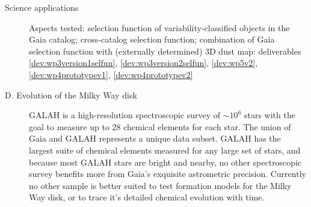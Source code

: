 \begin{workpackage}{Science applications}
\begin{wpobjectives}
\begin{description}
{ %
        
        
        \textsf{Aspects tested: selection function of variability-classified objects in the Gaia catalog; cross-catalog selection function; combination of Gaia selection function with (externally determined) 3D dust map: deliverables \ref{dev:wp3version1selfun}, \ref{dev:wp3version2selfun}, \ref{dev:wp5v2}, \ref{dev:wp4prototypev1}, \ref{dev:wp4prototypev2}}
     }
     
     \item[D. Evolution of the Milky Way disk]
        {GALAH is a high-resolution spectroscopic survey of $\sim10^6$ stars with the goal to measure up to 28 chemical elements for each star. The union of Gaia and GALAH represents a unique data subset. GALAH has the largest suite of chemical elements measured for any large set of stars, and because most GALAH stars are bright and nearby, no other spectroscopic survey benefits more from Gaia's exquisite astrometric precision. Currently no other sample is better suited to test formation models for the Milky Way disk, or to trace it's detailed chemical evolution with time.
      
}
\end{description}
\end{wpobjectives}
\end{workpackage}
